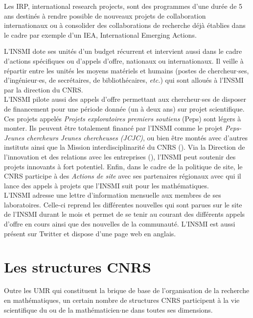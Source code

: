 Les IRP, international research projects, sont des programmes d'une dur\'ee de 5 ans destin\'es \`a rendre possible de nouveaux projets de collaboration internationaux ou \`a consolider des collaborations de recherche d\'ej\`a \'etablies dans le cadre par exemple d'un IEA, International Emerging Actions.

L'INSMI dote ses unit\'es d'un 
budget r\'ecurrent et intervient aussi dans le cadre d'actions sp\'ecifiques ou d'appels d'offre, nationaux ou  internationaux. Il veille \`a r\'epartir entre les unit\'es les 
 moyens mat\'eriels et humains
(postes de chercheur$\cdot$ses, d'ing\'enieur$\cdot$es, de secr\'etaires, de biblioth\'ecaires, {\em
etc.}) qui sont allou\'es \`a l'INSMI par la direction du CNRS.\\

L'INSMI pilote aussi des appels d'offre permettant aux chercheur$\cdot$ses de disposer de financement pour une p\'eriode donn\'ee (un \`a deux ans) sur projet scientifique. Ces projets appel\'es {\it Projets exploratoires premiers soutiens} (Peps) sont l\'egers \`a monter. Ils peuvent \^etre totalement financ\'e par l'INSMI comme le projet {\it Peps-Jeunes chercheurs Jeunes chercheuses (JCJC)}, ou bien \^etre mont\'es avec d'autres instituts ainsi que la Mission interdisciplinarit\'e du CNRS (). Via la Direction de l'innovation et des relations avec les entreprises (), l'INSMI peut soutenir des projets innovants \`a fort potentiel.  Enfin, dans le cadre de la politique de site, le CNRS participe \`a des {\it Actions de site} avec ses partenaires r\'egionaux avec qui il lance des appels \`a projets que l'INSMI suit pour les math\'ematiques.\\

L'INSMI adresse une lettre d'information mensuelle aux membres de ses laboratoires. Celle-ci reprend les diff\'erentes nouvelles qui sont parues sur le site de l'INSMI durant le mois et permet de se tenir au courant des diff\'erents appels d'offre en cours ainsi que des nouvelles de la communaut\'e. L'INSMI est aussi pr\'esent sur Twitter et dispose d'une page web en anglais. 


\section{Les structures CNRS}



Outre les UMR qui constituent la brique de base de l'organisation de la recherche en math\'ematiques, un certain nombre de structures CNRS participent \`a la vie scientifique du ou de la math\'ematicien$\cdot$ne dans toutes ses dimensions. 




